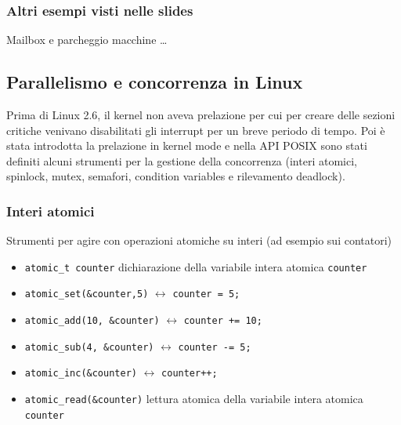 \documentclass[a4paper]{article}
\begin{document}
\subsubsection*{Altri esempi visti nelle slides}
Mailbox e parcheggio macchine \dots


\subsection{Parallelismo e concorrenza in Linux}
Prima di Linux 2.6, il kernel non aveva prelazione per cui per creare delle sezioni critiche venivano disabilitati gli interrupt
per un breve periodo di tempo. Poi è stata introdotta la prelazione in kernel mode e nella API POSIX sono stati definiti alcuni
strumenti per la gestione della concorrenza (interi atomici, spinlock, mutex, semafori, condition variables e rilevamento deadlock).

\subsubsection*{Interi atomici}
Strumenti per agire con operazioni atomiche su interi (ad esempio sui contatori)
\begin{itemize}
	\item \verb|atomic_t counter| dichiarazione della variabile intera atomica \verb|counter|
	\item \verb|atomic_set(&counter,5)| \(\leftrightarrow\) \verb|counter = 5;|
	\item \verb|atomic_add(10, &counter)| \(\leftrightarrow\) \verb|counter += 10;|
	\item \verb|atomic_sub(4, &counter)| \(\leftrightarrow\) \verb|counter -= 5;|
	\item \verb|atomic_inc(&counter)| \(\leftrightarrow\) \verb|counter++;|
	\item \verb|atomic_read(&counter)| lettura atomica della variabile intera atomica \verb|counter|
\end{itemize}
\end{document}
